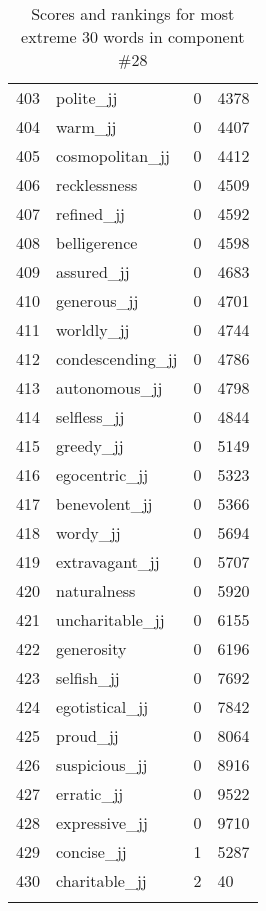 \begin{longtable}[!htbp]{| rlr@{.}l |}
    403 & polite\_jj & 0 & 4378 \\
    404 & warm\_jj & 0 & 4407 \\
    405 & cosmopolitan\_jj & 0 & 4412 \\
    406 & recklessness & 0 & 4509 \\
    407 & refined\_jj & 0 & 4592 \\
    408 & belligerence & 0 & 4598 \\
    409 & assured\_jj & 0 & 4683 \\
    410 & generous\_jj & 0 & 4701 \\
    411 & worldly\_jj & 0 & 4744 \\
    412 & condescending\_jj & 0 & 4786 \\
    413 & autonomous\_jj & 0 & 4798 \\
    414 & selfless\_jj & 0 & 4844 \\
    415 & greedy\_jj & 0 & 5149 \\
    416 & egocentric\_jj & 0 & 5323 \\
    417 & benevolent\_jj & 0 & 5366 \\
    418 & wordy\_jj & 0 & 5694 \\
    419 & extravagant\_jj & 0 & 5707 \\
    420 & naturalness & 0 & 5920 \\
    421 & uncharitable\_jj & 0 & 6155 \\
    422 & generosity & 0 & 6196 \\
    423 & selfish\_jj & 0 & 7692 \\
    424 & egotistical\_jj & 0 & 7842 \\
    425 & proud\_jj & 0 & 8064 \\
    426 & suspicious\_jj & 0 & 8916 \\
    427 & erratic\_jj & 0 & 9522 \\
    428 & expressive\_jj & 0 & 9710 \\
    429 & concise\_jj & 1 & 5287 \\
    430 & charitable\_jj & 2 & 40 \\
    \hline
    \caption{Scores and rankings for most extreme 30 words in component \#28} \\
\end{longtable}
